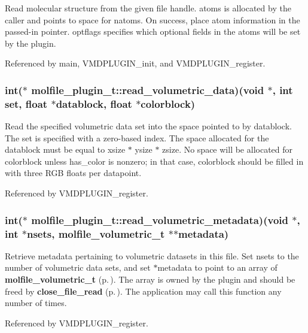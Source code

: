 Read molecular structure from the given file handle. atoms is allocated by the caller and points to space for natoms. On success, place atom information in the passed-in pointer.  optflags specifies which optional fields in the atoms will be set by the plugin. 

Referenced by main, VMDPLUGIN\_\-init, and VMDPLUGIN\_\-register.
\subsubsection{\setlength{\rightskip}{0pt plus 5cm}int($\ast$  molfile\_\-plugin\_\-t::read\_\-volumetric\_\-data)(void $\ast$, int set, float $\ast$datablock, float $\ast$colorblock)}\label{structmolfile__plugin__t_m11}


Read the specified volumetric data set into the space pointed to by  datablock. The set is specified with a zero-based index. The space  allocated for the datablock must be equal to xsize $\ast$ ysize $\ast$ zsize. No space will be allocated for colorblock  unless has\_\-color is nonzero; in that case, colorblock should be filled in with three RGB floats per datapoint. 

Referenced by VMDPLUGIN\_\-register.
\subsubsection{\setlength{\rightskip}{0pt plus 5cm}int($\ast$  molfile\_\-plugin\_\-t::read\_\-volumetric\_\-metadata)(void $\ast$, int $\ast$nsets, {\bf molfile\_\-volumetric\_\-t} $\ast$$\ast$metadata)}\label{structmolfile__plugin__t_m10}


Retrieve metadata pertaining to volumetric datasets in this file. Set nsets to the number of volumetric data sets, and set $\ast$metadata to point to an array of {\bf molfile\_\-volumetric\_\-t} {\rm (p.\,\pageref{structmolfile__volumetric__t})}. The array is owned by the plugin and should be freed by {\bf close\_\-file\_\-read} {\rm (p.\,\pageref{structmolfile__plugin__t_m5})}. The application may call this function any number of times. 

Referenced by VMDPLUGIN\_\-register.

